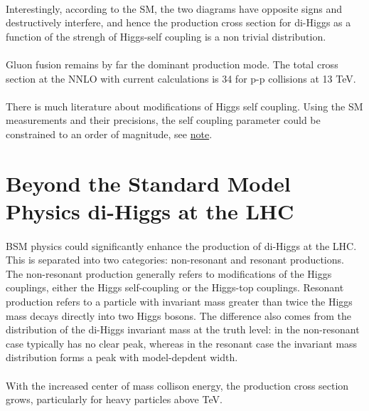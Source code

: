 \paragraph{}
Interestingly, according to the SM, the two diagrams have opposite signs and destructively interfere, and hence the production cross section for di-Higgs as a function of the strengh of Higgs-self coupling is a non trivial distribution.
\paragraph{}
Gluon fusion remains by far the dominant production mode. The total cross section at the NNLO with current calculations is 34 \ifb for p-p collisions at 13 TeV.
\paragraph{}
There is much literature about modifications of Higgs self coupling. Using the SM measurements and their precisions, the self coupling parameter could be constrained to an order of magnitude, see \href{https://arxiv.org/abs/1702.07678}{note}.


\section{Beyond the Standard Model Physics di-Higgs at the LHC}
\paragraph{}
BSM physics could significantly enhance the production of di-Higgs at the LHC. This is separated into two categories: non-resonant and resonant productions. The non-resonant production generally refers to modifications of the Higgs couplings, either the Higgs self-coupling or the Higgs-top couplings. Resonant production refers to a particle with invariant mass greater than twice the Higgs mass decays directly into two Higgs bosons. The difference also comes from the distribution of the di-Higgs invariant mass at the truth level: in the non-resonant case typically has no clear peak, whereas in the resonant case the invariant mass distribution forms a peak with model-depdent width.
\paragraph{}

\paragraph{}
With the increased center of mass collison energy, the production cross section grows, particularly for heavy particles above TeV.


